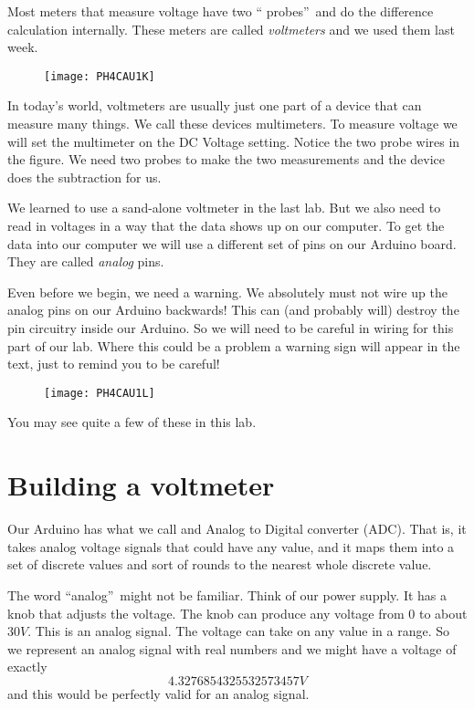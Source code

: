 Most meters that measure voltage have two \textquotedblleft
probes\textquotedblright\ and do the difference calculation internally.
These meters are called \emph{voltmeters} and we used them last week. \begin{figure}[h!]
\texttt{[image: PH4CAU1K]}
\end{figure}%
In today's world, voltmeters are usually just one part of a device that can
measure many things. We call these devices multimeters. To measure voltage
we will set the multimeter on the DC Voltage setting. Notice the two probe
wires in the figure. We need two probes to make the two measurements and the
device does the subtraction for us.

We learned to use a sand-alone voltmeter in the last lab. But we also need
to read in voltages in a way that the data shows up on our computer. To get
the data into our computer we will use a different set of pins on our
Arduino board. They are called \emph{analog} pins.

Even before we begin, we need a warning. We absolutely must not wire up the
analog pins on our Arduino backwards! This can (and probably will) destroy
the pin circuitry inside our Arduino. So we will need to be careful in
wiring for this part of our lab. Where this could be a problem a warning
sign will appear in the text, just to remind you to be careful! \begin{figure}[h!]
\texttt{[image: PH4CAU1L]}
\end{figure}%
You may see quite a few of these in this lab.

\section{Building a voltmeter}

Our Arduino has what we call and Analog to Digital converter (ADC). That is,
it takes analog voltage signals that could have any value, and it maps them
into a set of discrete values and sort of rounds to the nearest whole
discrete value.

The word \textquotedblleft analog\textquotedblright\ might not be familiar.
Think of our power supply. It has a knob that adjusts the voltage. The knob
can produce any voltage from $0$ to about $30\unit{V}$. This is an analog
signal. The voltage can take on any value in a range. So we represent an
analog signal with real numbers and we might have a voltage of exactly 
\begin{equation*}
4.3276854325532573457\unit{V}
\end{equation*}%
and this would be perfectly valid for an analog signal.

